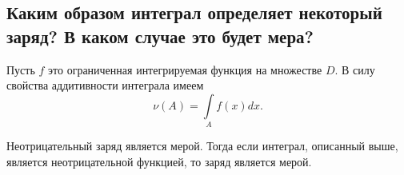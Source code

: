 \subsection{Каким образом интеграл определяет некоторый заряд? В каком случае это будет мера?}

Пусть $f$ это ограниченная интегрируемая функция на множестве $D$. В силу свойства аддитивности интеграла имеем
\begin{equation*}
    \nu(A) = \underset{A}{\int} f(x) dx.
\end{equation*}

Неотрицательный заряд является мерой. Тогда если интеграл, описанный выше, является неотрицательной функцией, то заряд является мерой.
